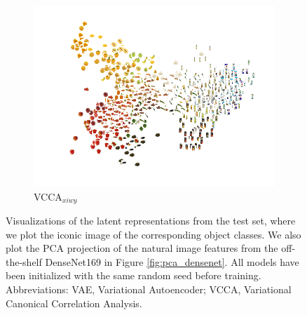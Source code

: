 \begin{figure}[t]
\begin{subfigure}[b]{0.3\textwidth}
         \centering
         \includegraphics[width=\textwidth]{figures_and_tables/latent_space_visualizations/pca_latents_vcca_xiwy_seed2.png}
         \caption{VCCA$_{x i w y}$}
         \label{fig:pca_vcca_xiwy}
     \end{subfigure} 
    \caption{Visualizations of the latent representations from the test set, where we plot the iconic image of the corresponding object classes. We also plot the PCA projection of the natural image features from the off-the-shelf DenseNet169 in Figure \ref{fig:pca_densenet}. All models have been initialized with the same random seed before training. Abbreviations: VAE, Variational Autoencoder; VCCA, Variational Canonical Correlation Analysis.}
    \label{fig:2d_visualizations_pca}
\end{figure}
